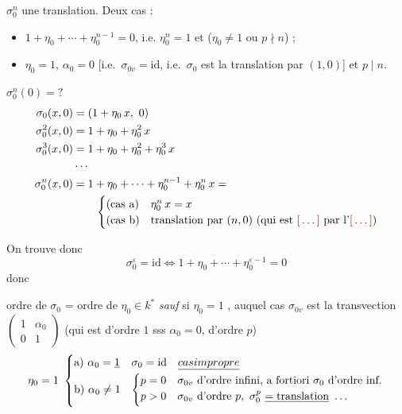 \documentclass[11pt,a4paper]{article}
\begin{document}
$\sigma_0^n$ une translation. Deux cas :
\begin{itemize}
\item[a)] $1 + \eta_0 + \cdots + \eta_0^{n-1} = 0$, i.e. \struck{\ill{}} $\eta_0^n = 1$ et ($\eta_0 \ne 1$ ou $p \nmid n$) ;
\item[b)] $\eta_0 = 1$, $\alpha_0 = 0$ [i.e.\ $\sigma_{0v} = \mathrm{id}$, i.e.\ $\sigma_0$ est la translation par $(1,0)$] et $p \mid n$.
\end{itemize}

$\sigma_0^n(0) = {?}$ \qquad {}
\[
\begin{aligned}
\sigma_0(x,0) &= (1 + \eta_0\,x,\ 0)\\
\sigma_0^2(x,0) &= 1 + \eta_0 + \eta_0^2\,x\\
\sigma_0^3(x,0) &= 1 + \eta_0 + \eta_0^2 + \eta_0^3\,x\\
&\cdots\\
\sigma_0^n(x,0) &= 1 + \eta_0 + \cdots + \eta_0^{n-1} + \eta_0^n\,x =\\
&\qquad \begin{cases}
(\text{cas a}) & \eta_0^n\,x = x\\
(\text{cas b}) & \text{translation par } (n,0) \text{ (qui est } \ill \text{ par l'} \ill\text{)}
\end{cases}
\end{aligned}
\]

On trouve donc
\[
\sigma_0^{\varepsilon} = \mathrm{id} \iff 1 + \eta_0 + \cdots + \eta_0^{\varepsilon-1} = 0
\]
donc

ordre de $\sigma_0$ = ordre de $\eta_0 \in k^*$ \emph{sauf} si $\eta_0 = 1$ , auquel cas $\sigma_{0v}$ est la transvection $\begin{pmatrix}1 & \alpha_0\\ 0 & 1\end{pmatrix}$ (qui est d'ordre $1$ sss $\alpha_0 = 0$,  d'ordre $p$)
\[
\eta_0 = 1\
\begin{cases}
\text{a)}\ \alpha_0 = \uncertain{1} & \sigma_0 = \mathrm{id}\quad \emph{cas impropre}\\[2pt]
\text{b)}\ \alpha_0 \ne 1 & \begin{cases}
p = 0 & \sigma_{0v} \text{ d'ordre infini, a fortiori } \sigma_0 \text{ d'ordre inf.}\\
p > 0 & \sigma_{0v} \text{ d'ordre } p,\ \sigma_0^p\ \struck{= \text{translation}}\ \ldots
\end{cases}
\end{cases}
\]
\end{document}
